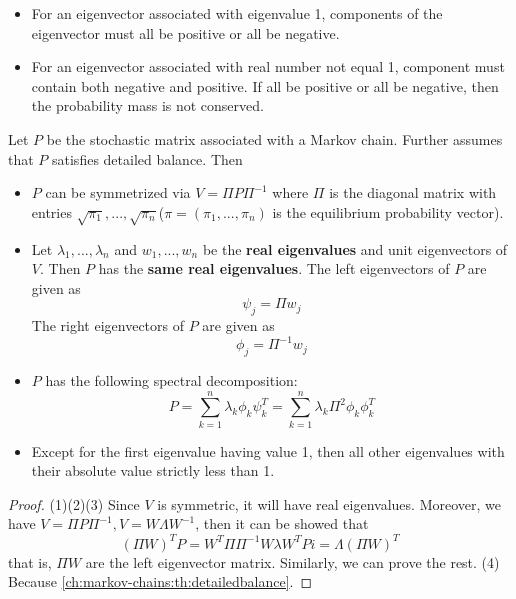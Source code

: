 \begin{refsection}
\begin{remark}
\begin{itemize}
	\item For an eigenvector associated with eigenvalue 1, components of the eigenvector must all be positive or all be negative. 
	\item For an eigenvector associated with real number not equal 1, component must contain both negative and positive. If all be positive or all be negative, then the probability mass is not conserved.
\end{itemize}
\end{remark}

\begin{theorem}\label{ch:markov-chains:th:detailedbalancechainspectrum}
Let $P$ be the stochastic matrix associated with a Markov chain. Further assumes that $P$ satisfies detailed balance. Then 
\begin{itemize}
	\item $P$ can be symmetrized via
	$V = \Pi P \Pi^{-1}$
	where $\Pi$ is the diagonal matrix with entries $\sqrt{\pi_1},...,\sqrt{\pi_n}$($\pi = (\pi_1,...,\pi_n)$ is the equilibrium probability vector).
	\item Let $\lambda_1,...,\lambda_n$ and $w_1,...,w_n$ be the \textbf{real eigenvalues} and unit eigenvectors of $V$. Then $P$ has the \textbf{same real eigenvalues}. The left eigenvectors of $P$ are given as
	$$\psi_j = \Pi w_j$$
	The right eigenvectors of $P$ are given as 
	$$\phi_j = \Pi^{-1} w_j$$
	\item $P$ has the following spectral decomposition:
	$$P = \sum_{k=1}^n \lambda_k \phi_k\psi_k^T = \sum_{k=1}^n \lambda_k \Pi^2\phi_k\phi_k^T$$
	\item Except for the first eigenvalue having value 1, then all other eigenvalues with their absolute value strictly less than 1.
\end{itemize}
\end{theorem}
\begin{proof}
(1)(2)(3)
Since $V$ is symmetric, it will have real eigenvalues. Moreover, 
we have $V = \Pi P \Pi^{-1}, V = W\Lambda W^{-1}$, then
it can be showed that
$$(\Pi W)^T P = W^T\Pi \Pi^{-1} W \lambda W^TPi = \Lambda (\Pi W)^T$$
that is, $\Pi W$ are the left eigenvector matrix. Similarly, we can prove the rest.
(4) Because \autoref{ch:markov-chains:th:detailedbalance}.
\end{proof}


\end{refsection}
